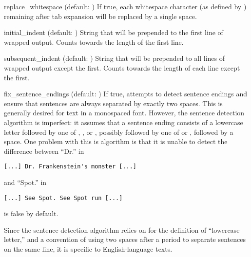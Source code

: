 \begin{memberdesc}{replace_whitespace}
(default: ) If true, each whitespace character (as defined
by ) remaining after tab expansion will be
replaced by a single space.  
\end{memberdesc}

\begin{memberdesc}{initial_indent}
(default: ) String that will be prepended to the first line
of wrapped output.  Counts towards the length of the first line.
\end{memberdesc}

\begin{memberdesc}{subsequent_indent}
(default: ) String that will be prepended to all lines of
wrapped output except the first.  Counts towards the length of each
line except the first.
\end{memberdesc}

\begin{memberdesc}{fix_sentence_endings}
(default: ) If true,  attempts to detect
sentence endings and ensure that sentences are always separated by
exactly two spaces.  This is generally desired for text in a monospaced
font.  However, the sentence detection algorithm is imperfect: it
assumes that a sentence ending consists of a lowercase letter followed
by one of ,
\character{!}, or , possibly followed by one of
 or , followed by a space.  One problem
with this is algorithm is that it is unable to detect the difference
between ``Dr.'' in

\begin{verbatim}
[...] Dr. Frankenstein's monster [...]
\end{verbatim}

and ``Spot.'' in

\begin{verbatim}
[...] See Spot. See Spot run [...]
\end{verbatim}

 is false by default.

Since the sentence detection algorithm relies on
 for the definition of ``lowercase letter,''
and a convention of using two spaces after a period to separate
sentences on the same line, it is specific to English-language texts.
\end{memberdesc}

